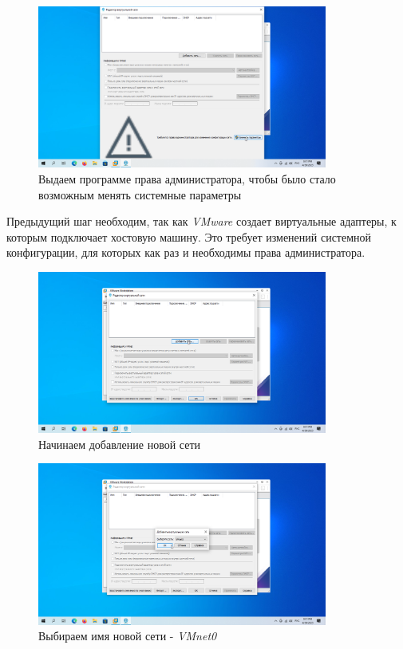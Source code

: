 \documentclass[a4paper]{article}
\begin{document}
  \begin{figure}[H]
    \centering
    \includegraphics[width=0.85\textwidth]{Screenshot_3}
    \caption{Выдаем программе права администратора, чтобы было стало возможным менять системные параметры}
    \label{img:3}
  \end{figure}

  Предыдущий шаг необходим, так как \textit{VMware} создает виртуальные адаптеры,
  к которым подключает хостовую машину. Это требует изменений системной конфигурации,
  для которых как раз и необходимы права администратора.

  \begin{figure}[H]
    \centering
    \includegraphics[width=0.85\textwidth]{Screenshot_4}
    \caption{Начинаем добавление новой сети}
    \label{img:4}
  \end{figure}

  \begin{figure}[H]
    \centering
    \includegraphics[width=0.85\textwidth]{Screenshot_5}
    \caption{Выбираем имя новой сети - \textit{VMnet0}}
    \label{img:5}
  \end{figure}
\end{document}
